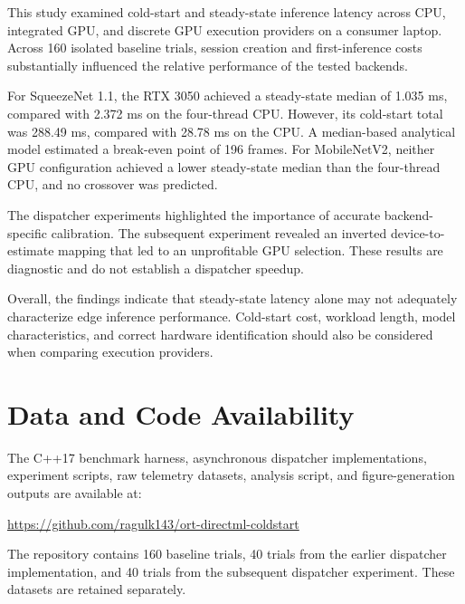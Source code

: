\documentclass[pdflatex,sn-mathphys-num]{sn-jnl}
\begin{document}
This study examined cold-start and steady-state inference latency across CPU, integrated GPU, and discrete GPU execution providers on a consumer laptop. Across 160 isolated baseline trials, session creation and first-inference costs substantially influenced the relative performance of the tested backends.

For SqueezeNet 1.1, the RTX 3050 achieved a steady-state median of 1.035 ms, compared with 2.372 ms on the four-thread CPU. However, its cold-start total was 288.49 ms, compared with 28.78 ms on the CPU. A median-based analytical model estimated a break-even point of 196 frames. For MobileNetV2, neither GPU configuration achieved a lower steady-state median than the four-thread CPU, and no crossover was predicted.

The dispatcher experiments highlighted the importance of accurate backend-specific calibration. The subsequent experiment revealed an inverted device-to-estimate mapping that led to an unprofitable GPU selection. These results are diagnostic and do not establish a dispatcher speedup.

Overall, the findings indicate that steady-state latency alone may not adequately characterize edge inference performance. Cold-start cost, workload length, model characteristics, and correct hardware identification should also be considered when comparing execution providers.

\section*{Data and Code Availability}

The C++17 benchmark harness, asynchronous dispatcher implementations, experiment scripts, raw telemetry datasets, analysis script, and figure-generation outputs are available at:

\url{https://github.com/ragulk143/ort-directml-coldstart}

The repository contains 160 baseline trials, 40 trials from the earlier dispatcher implementation, and 40 trials from the subsequent dispatcher experiment. These datasets are retained separately.


\end{document}
